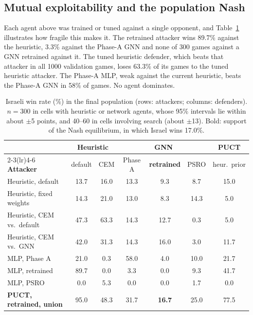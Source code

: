 \documentclass{article}
\begin{document}
\subsection{Mutual exploitability and the population Nash}
\label{sec:nash}
Each agent above was trained or tuned against a single opponent, and
Table~\ref{tab:matrix} illustrates how fragile this makes it. The retrained attacker wins
89.7\% against the heuristic, 3.3\% against the Phase-A GNN and none of 300 games against
a GNN retrained against it. The tuned heuristic defender, which beats that attacker in
all 1000 validation games, loses 63.3\% of its games to the tuned heuristic attacker. The
Phase-A MLP, weak against the current heuristic, beats the Phase-A GNN in 58\% of games.
No agent dominates.

\begin{table}[t]
\centering
\small
\caption{Israeli win rate (\%) in the final population (rows: attackers; columns:
defenders). $n=300$ in cells with heuristic or network agents, whose 95\% intervals lie
within about $\pm$5 points, and 40--60 in cells involving search (about $\pm$13). Bold:
support of the Nash equilibrium, in which Israel wins 17.0\%.}
\label{tab:matrix}
\setlength{\tabcolsep}{4pt}
\begin{tabular}{lcccccc}
\toprule
 & \multicolumn{2}{c}{\textbf{Heuristic}} & \multicolumn{3}{c}{\textbf{GNN}} & \textbf{PUCT} \\
\cmidrule(lr){2-3}\cmidrule(lr){4-6}
\textbf{Attacker} & default & CEM & Phase A & \textbf{retrained} & PSRO & heur.\ prior \\
\midrule
Heuristic, default                 & 13.7 & 16.0 & 13.3 & 9.3  & 8.7  & 15.0 \\
Heuristic, fixed weights           & 14.3 & 21.0 & 13.0 & 8.3  & 14.3 & 5.0 \\
Heuristic, CEM vs.\ default        & 47.3 & 63.3 & 14.3 & 12.7 & 0.3  & 5.0 \\
Heuristic, CEM vs.\ GNN            & 42.0 & 31.3 & 14.3 & 16.0 & 3.0  & 11.7 \\
MLP, Phase A                       & 21.0 & 0.3  & 58.0 & 4.0  & 10.0 & 21.7 \\
MLP, retrained                     & 89.7 & 0.0  & 3.3  & 0.0  & 9.3  & 41.7 \\
MLP, PSRO                          & 0.0  & 5.3  & 0.0  & 0.0  & 1.7  & 0.0 \\
\textbf{PUCT, retrained, union}    & 95.0 & 48.3 & 31.7 & \textbf{16.7} & 25.0 & 77.5 \\
\bottomrule
\end{tabular}
\end{table}
\end{document}
